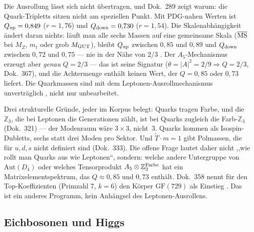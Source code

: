 Die Ausrollung lässt sich nicht übertragen, und Dok.~289 zeigt warum: die
Quark-Tripletts sitzen nicht am speziellen Punkt. Mit PDG-nahen Werten ist
$Q_{\rm up} = 0{,}849$ ($r = 1{,}76$) und $Q_{\rm down} = 0{,}730$
($r = 1{,}54$). Die Skalenabhängigkeit ändert daran nichts: läuft man alle
sechs Massen auf eine gemeinsame Skala ($\overline{\rm MS}$ bei $M_Z$, $m_t$
oder grob $M_{\rm GUT}$), bleibt $Q_{\rm up}$ zwischen $0{,}85$ und $0{,}89$
und $Q_{\rm down}$ zwischen $0{,}72$ und $0{,}75$ --- nie in der Nähe von
$2/3$ \KM. Der $A_5$-Mechanismus erzeugt aber
\emph{genau} $Q = 2/3$ --- das ist seine Signatur ($\theta = |A|^2 = 2/9
\Rightarrow Q = 2/3$, Dok.~367), und die Achtermenge enthält keinen Wert, der
$Q = 0{,}85$ oder $0{,}73$ liefert. Die Quarkmassen sind mit dem
Leptonen-Ausrollmechanismus unverträglich \XM, nicht nur unbearbeitet.

Drei strukturelle Gründe, jeder im Korpus belegt: Quarks tragen Farbe, und die
$\mathbb Z_3$, die bei Leptonen die Generationen zählt, ist bei Quarks zugleich
die Farb-$\mathbb Z_3$ (Dok.~321) --- der Modenraum wäre $3\times3$, nicht~3.
Quarks kommen als Isospin-Dubletts, sechs statt drei Moden pro Sektor.
Und $\tilde T\cdot m = 1$ gibt Polmassen, die für $u,d,s$ nicht definiert sind
(Dok.~333). Die offene Frage lautet daher nicht ,,wie rollt man Quarks aus wie
Leptonen``, sondern: welche andere Untergruppe von $\mathrm{Aut}(D_4)$ oder
welches Tensorprodukt $A_5\otimes\mathbb Z_3^{\rm Farbe}$ hat ein
Matrixelementspektrum, das $Q\approx0{,}85$ und $0{,}73$ enthält. Dok.~358
nennt für den Top-Koeffizienten (Primzahl 7, $k=6$) den Körper
$\mathrm{GF}(729)$ als Einstieg \SM. Das ist ein anderes Programm, kein
Anhängsel des Leptonen-Ausrollens.

\subsection{Eichbosonen und Higgs}
\label{sec:bosonen}

